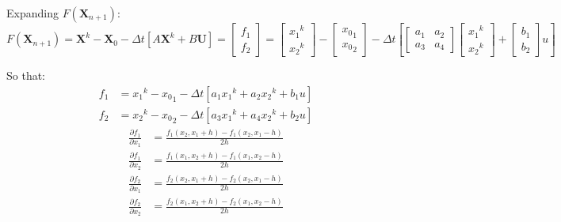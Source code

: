 \documentclass[11pt]{article}
\begin{document}
Expanding $F(\mathbf{X}_{n+1})$:
\begin{equation}
  F(\mathbf{X}_{n+1}) =
  \mathbf{X}^k - \mathbf{X}_0 - \Delta t \left[A \mathbf{X}^k + B \mathbf{U}\right] =
  \begin{bmatrix}
    f_1 \\
    f_2
  \end{bmatrix} =
  \begin{bmatrix}
    {x_1}^k \\
    {x_2}^k
  \end{bmatrix} -
  \begin{bmatrix}
    {x_0}_1 \\
    {x_0}_2
  \end{bmatrix} - \Delta t \left[
  \begin{bmatrix}
    a_1 & a_2 \\
    a_3 & a_4
  \end{bmatrix}
  \begin{bmatrix}
    {x_1}^k \\
    {x_2}^k
  \end{bmatrix} +
  \begin{bmatrix}
    b_1 \\
    b_2
  \end{bmatrix}
  u
  \right]
\end{equation}

So that:
\begin{subequations}
  \begin{align}
    f_1 &= {x_1}^k - {x_0}_1 - \Delta t\left[a_1{x_1}^k + a_2{x_2}^k + b_1 u \right] \\
    f_2 &= {x_2}^k - {x_0}_2 - \Delta t\left[a_3{x_1}^k + a_4{x_2}^k + b_2 u \right]
  \end{align}
\end{subequations}
\begin{subequations}
  \begin{align}
    \frac{\partial f_1}{\partial x_1} &= \frac{f_1(x_2, x_1+h) - f_1(x_2, x_1-h)}{2h} \\
    \frac{\partial f_1}{\partial x_2} &= \frac{f_1(x_1, x_2+h) - f_1(x_1, x_2-h)}{2h} \\
    \frac{\partial f_2}{\partial x_1} &= \frac{f_2(x_2, x_1+h) - f_2(x_2, x_1-h)}{2h} \\
    \frac{\partial f_2}{\partial x_2} &= \frac{f_2(x_1, x_2+h) - f_2(x_1, x_2-h)}{2h}
  \end{align}
\end{subequations}
\end{document}
